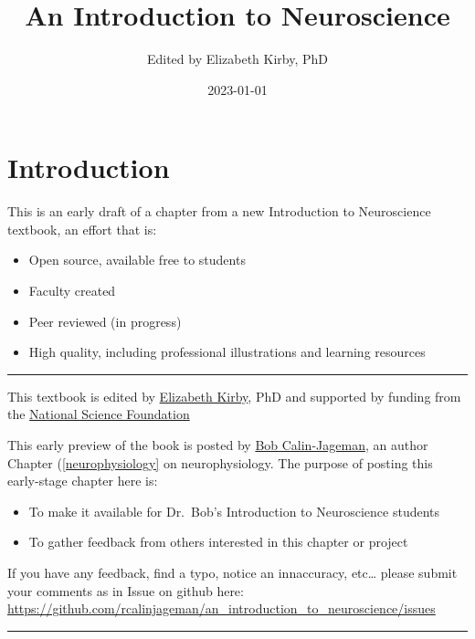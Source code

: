 \documentclass[
]{book}
\title{An Introduction to Neuroscience}
\author{Edited by Elizabeth Kirby, PhD}
\date{2023-01-01}
\begin{document}
\maketitle

{
\setcounter{tocdepth}{1}
\tableofcontents
}
\hypertarget{introduction}{%
\chapter{Introduction}\label{introduction}}

This is an early draft of a chapter from a new Introduction to Neuroscience textbook, an effort that is:

\begin{itemize}
\item
  Open source, available free to students
\item
  Faculty created
\item
  Peer reviewed (in progress)
\item
  High quality, including professional illustrations and learning resources
\end{itemize}

\begin{center}\rule{0.5\linewidth}{0.5pt}\end{center}

This textbook is edited by \href{https://u.osu.edu/kirbylab/}{Elizabeth Kirby}, PhD and supported by funding from the \href{https://www.nsf.gov/awardsearch/simpleSearchResult?queryText=elizabeth+kirby\&ActiveAwards=true}{National Science Foundation}

This early preview of the book is posted by \href{https://calin-jageman.net/lab/}{Bob Calin-Jageman}, an author Chapter (\ref{neurophysiology} on neurophysiology. The purpose of posting this early-stage chapter here is:

\begin{itemize}
\item
  To make it available for Dr.~Bob's Introduction to Neuroscience students
\item
  To gather feedback from others interested in this chapter or project
\end{itemize}

If you have any feedback, find a typo, notice an innaccuracy, etc\ldots{} please submit your comments as in Issue on github here: \url{https://github.com/rcalinjageman/an_introduction_to_neuroscience/issues}

\begin{center}\rule{0.5\linewidth}{0.5pt}\end{center}
\end{document}
